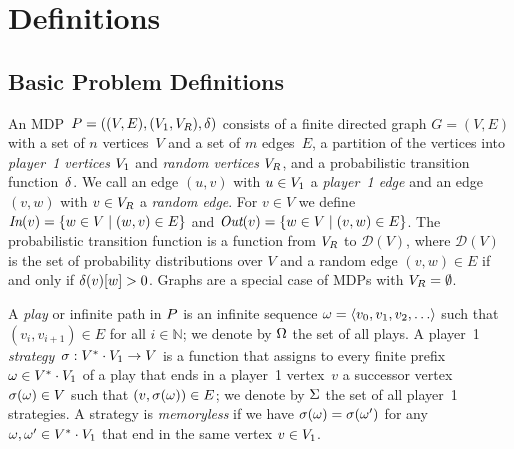 \vspace{-3mm}
\section{Definitions}\label{sec:defin}

\vspace{-2mm}
\subsection{Basic Problem Definitions}

\vspace{-1mm}
\smallskip{}
An MDP~$P = ((V, E), \allowbreak(V_1, V_R), \allowbreak\delta)$ consists of a
finite directed graph $G = (V, E)$ with a set of $n$ vertices~$V$ and a set of $m$ 
edges~$E$, a partition of the vertices into 
\emph{player~1 vertices} $V_1$ and \emph{random vertices} $V_R$, and a 
probabilistic transition function~$\delta$. We call an edge $(u,v)$ with
$u \in V_1$ a \emph{player~1 edge} and an edge $(v, w)$ with $v \in V_R$ a
\emph{random edge}. For $v \in V$ we define $\operatorname{\textit{In}}(v)=\{w \in V \mid (w,v) \in E\}$
and $\operatorname{\textit{Out}}(v)=\{w \in V \mid (v,w) \in E\}$.
The probabilistic transition function is a function from $V_R$ to $\mathcal{D}(V)$, 
where $\mathcal{D}(V)$ is the set of probability distributions over $V$ and 
a random edge $(v, w) \in E$ if and only if $\delta(v)[w] > 0$.
Graphs are a special case of MDPs with $V_R = \emptyset$.

\vspace{-0.5mm}
\smallskip{} 
A \emph{play} or infinite path in $P$ is an infinite sequence $\omega = \langle v_0, 
v_1, v_2, \ldots \rangle$ such that $(v_i, v_{i+1}) \in E$ for all $i \in \mathbb{N}$;
we denote by $\Omega$ the set of all plays.
A player~1 \emph{strategy}~$\sigma: V^* \cdot V_1 \rightarrow V$ is a function that 
assigns to every finite prefix~$\omega \in V^* \cdot V_1$ of a play that ends in a 
player~1 vertex~$v$ a successor vertex $\sigma(\omega) \in V$ such that 
$(v, \sigma(\omega)) \in E$; we denote by $\Sigma$ the 
set of all player~1 strategies. A strategy is \emph{memoryless} if we have 
$\sigma(\omega) = \sigma(\omega')$ for any $\omega, \omega' \in V^* \cdot V_1$ that 
end in the same vertex $v \in V_1$.

